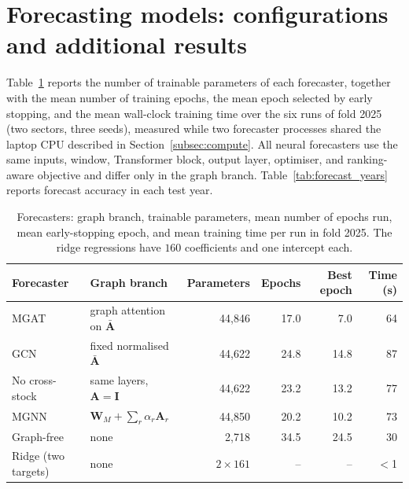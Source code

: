 \documentclass[pdflatex,sn-mathphys-num]{sn-jnl}%
\theoremstyle{thmstyleone}%
\theoremstyle{thmstyletwo}%
\theoremstyle{thmstylethree}%
\begin{document}
\section{Forecasting models: configurations and additional results}
\label{app:model_complexity}

{\color{blue}Table~\ref{tab:param_count} reports the number of trainable parameters of each forecaster, together with the mean number of training epochs, the mean epoch selected by early stopping, and the mean wall-clock training time over the six runs of fold 2025 (two sectors, three seeds), measured while two forecaster processes shared the laptop CPU described in Section~\ref{subsec:compute}. All neural forecasters use the same inputs, window, Transformer block, output layer, optimiser, and ranking-aware objective and differ only in the graph branch. Table~\ref{tab:forecast_years} reports forecast accuracy in each test year.\par}

\begin{table}[!h]
\centering\small
\color{blue}
\caption{Forecasters: graph branch, trainable parameters, mean number of epochs run, mean early-stopping epoch, and mean training time per run in fold 2025. The ridge regressions have $160$ coefficients and one intercept each.}
\label{tab:param_count}
\setlength{\tabcolsep}{4pt}
\begin{tabular}{llrrrr}
\toprule
Forecaster & Graph branch & Parameters & Epochs & Best epoch & Time (s) \\
\midrule
MGAT & graph attention on $\bar{\mathbf{A}}$ & 44{,}846 & 17.0 & 7.0 & 64 \\
GCN & fixed normalised $\bar{\mathbf{A}}$ & 44{,}622 & 24.8 & 14.8 & 87 \\
No cross-stock & same layers, $\mathbf{A}=\mathbf{I}$ & 44{,}622 & 23.2 & 13.2 & 77 \\
MGNN & $\mathbf{W}_M+\sum_r\alpha_r\mathbf{A}_r$ & 44{,}850 & 20.2 & 10.2 & 73 \\
Graph-free & none & 2{,}718 & 34.5 & 24.5 & 30 \\
Ridge (two targets) & none & $2\times161$ & -- & -- & $<$1 \\
\bottomrule
\end{tabular}
\end{table}
\end{document}
